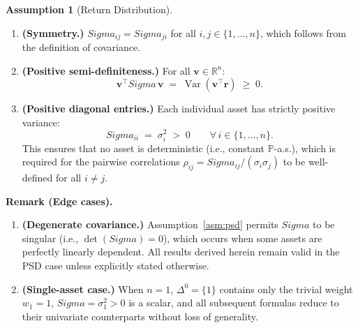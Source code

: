 \documentclass[12pt,openany]{book}
\newcommand{\R}{\mathbb{R}}
\newcommand{\Prob}{\mathbb{P}}
\newcommand{\bfv}{\mathbf{v}}
\newcommand{\bfSigma}{\boldsymbol{\Sigma}}
\DeclareMathOperator{\Var}{Var}
\numberwithin{equation}{chapter}
\theoremstyle{plain}
\theoremstyle{definition}
\newtheorem{assumption}[theorem]{Assumption}
\theoremstyle{remark}
\def\bfSigma{Sigma}%
\begin{document}
\begin{assumption}[Return Distribution]
\begin{enumerate}[label=\textbf{(R\arabic*)}, leftmargin=*, widest=R3]
\begin{enumerate}[label=\textbf{(R3.\alph*)},
                          leftmargin=*, widest=R3.c]
          \item \textbf{(Symmetry.)}
                $\bfSigma_{ij} = \bfSigma_{ji}$ for all
                $i, j \in \{1,\ldots,n\}$,
                which follows from the definition of covariance.

          \item \textbf{(Positive semi-definiteness.)}
                For all $\bfv \in \R^n$:
                \begin{equation}
                  \bfv^\top \bfSigma\, \bfv
                  \;=\;
                  \Var\!\left(\bfv^\top \mathbf{r}\right)
                  \;\geq\; 0.
                  \label{asm:psd}
                \end{equation}

          \item \textbf{(Positive diagonal entries.)}
                Each individual asset has strictly positive variance:
                \begin{equation}
                  \bfSigma_{ii}
                  \;=\; \sigma_i^2
                  \;>\; 0
                  \qquad \forall\, i \in \{1,\ldots,n\}.
                  \label{asm:posvar}
                \end{equation}
                This ensures that no asset is deterministic
                (i.e., constant $\Prob$-a.s.),
                which is required for the pairwise correlations
                $\rho_{ij} = \bfSigma_{ij}/(\sigma_i\sigma_j)$
                to be well-defined for all $i \neq j$.

        \end{enumerate}

\end{enumerate}

\noindent
\textbf{Remark (Edge cases).}
\begin{enumerate}[label=\textbf{(E\arabic*)}, leftmargin=*, widest=E2]

  \item \textbf{(Degenerate covariance.)}
        Assumption~\eqref{asm:psd} permits $\bfSigma$ to be
        singular (i.e., $\det(\bfSigma) = 0$),
        which occurs when some assets are
        perfectly linearly dependent.
        All results derived herein remain valid
        in the PSD case unless explicitly stated otherwise.

  \item \textbf{(Single-asset case.)}
        When $n = 1$, $\Delta^{0} = \{1\}$ contains only
        the trivial weight $w_1 = 1$,
        $\bfSigma = \sigma_1^2 > 0$ is a scalar,
        and all subsequent formulas reduce to their
        univariate counterparts without loss of generality.

\end{enumerate}
\end{assumption}
\end{document}
